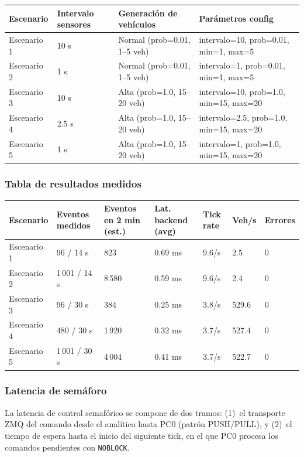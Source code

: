 \documentclass[12pt, a4paper]{article}
\begin{document}
\begin{longtable}{|p{2.8cm}|p{3cm}|p{3.5cm}|p{5.2cm}|}
\hline
\rowcolor{gray!20}
\textbf{Escenario} & \textbf{Intervalo sensores} & \textbf{Generación de vehículos} & \textbf{Parámetros config} \\
\hline
Escenario 1 & 10 s & Normal (prob=0.01, 1--5 veh) & intervalo=10, prob=0.01, min=1, max=5 \\
\hline
Escenario 2 & 1 s & Normal (prob=0.01, 1--5 veh) & intervalo=1, prob=0.01, min=1, max=5 \\
\hline
Escenario 3 & 10 s & Alta (prob=1.0, 15--20 veh) & intervalo=10, prob=1.0, min=15, max=20 \\
\hline
Escenario 4 & 2.5 s & Alta (prob=1.0, 15--20 veh) & intervalo=2.5, prob=1.0, min=15, max=20 \\
\hline
Escenario 5 & 1 s & Alta (prob=1.0, 15--20 veh) & intervalo=1, prob=1.0, min=15, max=20 \\
\hline
\end{longtable}

\subsubsection{Tabla de resultados medidos}

\begin{longtable}{|p{2.3cm}|p{2cm}|p{2cm}|p{2.3cm}|p{1.8cm}|p{1.8cm}|p{1.5cm}|}
\hline
\rowcolor{gray!20}
\textbf{Escenario} &
\textbf{Eventos medidos} &
\textbf{Eventos en 2 min (est.)} &
\textbf{Lat. backend (avg)} &
\textbf{Tick rate} &
\textbf{Veh/s} &
\textbf{Errores} \\
\hline
Escenario 1 & 96 / 14 s & 823 & 0.69 ms & 9.6/s & 2.5 & 0 \\
\hline
Escenario 2 & 1\,001 / 14 s & 8\,580 & 0.59 ms & 9.6/s & 2.4 & 0 \\
\hline
Escenario 3 & 96 / 30 s & 384 & 0.25 ms & 3.8/s & 529.6 & 0 \\
\hline
Escenario 4 & 480 / 30 s & 1\,920 & 0.32 ms & 3.7/s & 527.4 & 0 \\
\hline
Escenario 5 & 1\,001 / 30 s & 4\,004 & 0.41 ms & 3.7/s & 522.7 & 0 \\
\hline
\end{longtable}

\subsubsection{Latencia de semáforo}

La latencia de control semafórico se compone de dos tramos: (1)~el transporte ZMQ del comando desde el analítico hasta PC0 (patrón PUSH/PULL), y (2)~el tiempo de espera hasta el inicio del siguiente tick, en el que PC0 procesa los comandos pendientes con \texttt{NOBLOCK}.
\end{document}
